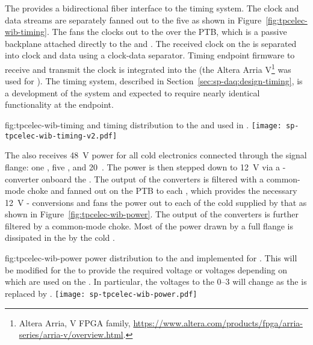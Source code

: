 
The   provides a bidirectional fiber interface to the
timing system. The clock and data streams are separately fanned out to the 
five  as shown in Figure~\ref{fig:tpcelec-wib-timing}. The 
 fans the clocks out to the  over the PTB, which is a 
passive backplane attached directly to the  and
.  The received clock on the  is separated into clock and
data using a clock-data separator. Timing endpoint firmware to receive and transmit
the clock is integrated into the   (the Altera 
Arria V\footnote{Altera Arria\texttrademark{}, V FPGA family, 
\url{https://www.altera.com/products/fpga/arria-series/arria-v/overview.html}.} 
was used for ).  The  timing system, described in 
Section~\ref{sec:sp-daq:design-timing}, is a development of the  
system and expected to require nearly identical functionality at the 
 endpoint.

\begin{dunefigure}
{fig:tpcelec-wib-timing}
{ and timing distribution to the  and  used in .}
\texttt{[image: sp-tpcelec-wib-timing-v2.pdf]}
\end{dunefigure}

The  also receives \SI{48}{V}  power for all cold
electronics connected through the  signal flange: 
one , five , and \num{20}~. 
The  power is then stepped down to \SI{12}{V} via 
a - converter onboard the . The output 
of the  converters is filtered with a common-mode choke 
and fanned out on the PTB to each , which provides the 
necessary \SI{12}{V} - conversions and fans
the  power out to each of the cold  supplied 
by that  as shown in Figure~\ref{fig:tpcelec-wib-power}. 
The output of the  converters is further filtered by a 
common-mode choke. Most of the power drawn by a full flange is 
dissipated in the  by the cold .

\begin{dunefigure}
{fig:tpcelec-wib-power}
{ power distribution to the  and  
implemented for . This will be modified for the 
 to provide the required voltage or voltages 
depending on which  are used on the . 
In particular, the voltages to the  \numrange{0}{3} 
will change as the   is replaced by . }
\texttt{[image: sp-tpcelec-wib-power.pdf]}
\end{dunefigure}

